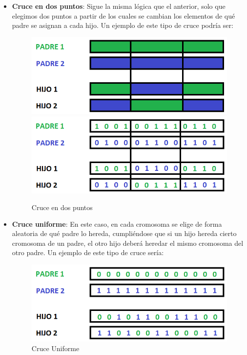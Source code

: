 \begin{itemize}
	\item \textbf{Cruce en dos puntos}: Sigue la misma lógica que el anterior, solo que elegimos dos puntos a partir de los cuales se cambian los elementos de qué padre se asignan a cada hijo. 
Un ejemplo de este tipo de cruce podría ser:
\begin{figure}[H]
		\centering
		\includegraphics[scale=0.5]{imagenes/Crossover2point.png}
		\includegraphics[scale=0.5]{imagenes/Crossover2pointNumber.png}
        \caption{Cruce en dos puntos}
        \label{fig:Crossover2}
\end{figure}
	\item \textbf{Cruce uniforme}: En este caso, en cada cromosoma se elige de forma aleatoria de qué padre lo hereda, cumpliéndose que si un hijo hereda cierto cromosoma de un padre, el otro hijo deberá heredar el mismo cromosoma del otro padre. 
Un ejemplo de este tipo de cruce sería: 
\begin{figure}[H]
		\centering
		\includegraphics[scale=0.5]{imagenes/CrossoverUniformNumber.png}
        \caption{Cruce Uniforme}
        \label{fig:CrossoverUniform}
\end{figure}
\end{itemize}

